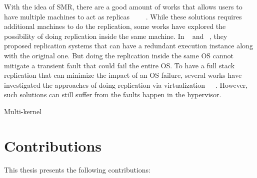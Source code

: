 With the idea of SMR, there are a good amount of works that allows users to have multiple machines to act as replicas ~\cite{cui2015p}~\cite{zagorodnov2009practical}~\cite{singh2009zeno}~\cite{mao2008mencius}. While these solutions requires additional machines to do the replication, some works have explored the possibility of doing replication inside the same machine. In ~\cite{zhang2012runtime} and ~\cite{lee2010respec}, they proposed replication systems that can have a redundant execution instance along with the original one. But doing the replication inside the same OS cannot mitigate a transient fault that could fail the entire OS. To have a full stack replication that can minimize the impact of an OS failure, several works have investigated the approaches of doing replication via virtualization~\cite{bressoud1996hypervisor}~\cite{lorch2015tardigrade}~\cite{dunlap2002revirt}. However, such solutions can still suffer from the faults happen in the hypervisor.

Multi-kernel


\section{Contributions}

This thesis presents the following contributions:

